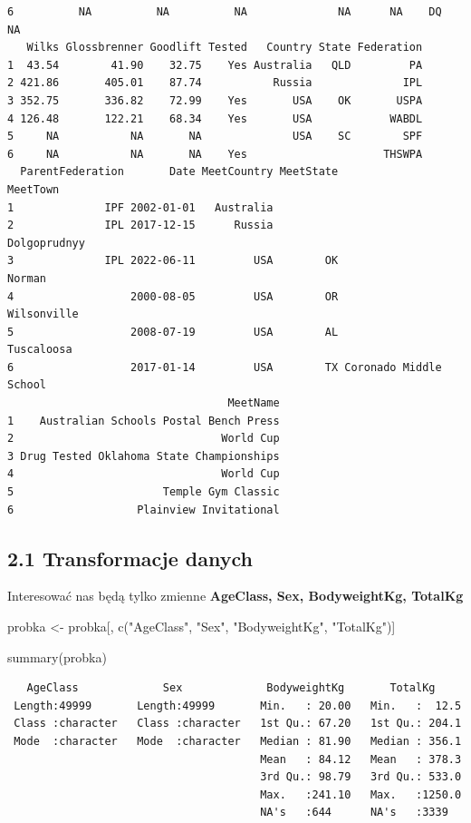 \documentclass[
  letterpaper,
  DIV=11,
  numbers=noendperiod]{scrartcl}
\newenvironment{Shaded}{\begin{snugshade}}{\end{snugshade}}
\newcommand{\FunctionTok}[1]{\textcolor[rgb]{0.28,0.35,0.67}{#1}}
\newcommand{\NormalTok}[1]{\textcolor[rgb]{0.00,0.23,0.31}{#1}}
\newcommand{\OtherTok}[1]{\textcolor[rgb]{0.00,0.23,0.31}{#1}}
\newcommand{\StringTok}[1]{\textcolor[rgb]{0.13,0.47,0.30}{#1}}
\begin{document}
\begin{verbatim}
6          NA          NA          NA              NA      NA    DQ     NA
   Wilks Glossbrenner Goodlift Tested   Country State Federation
1  43.54        41.90    32.75    Yes Australia   QLD         PA
2 421.86       405.01    87.74           Russia              IPL
3 352.75       336.82    72.99    Yes       USA    OK       USPA
4 126.48       122.21    68.34    Yes       USA            WABDL
5     NA           NA       NA              USA    SC        SPF
6     NA           NA       NA    Yes                     THSWPA
  ParentFederation       Date MeetCountry MeetState               MeetTown
1              IPF 2002-01-01   Australia                                 
2              IPL 2017-12-15      Russia                     Dolgoprudnyy
3              IPL 2022-06-11         USA        OK                 Norman
4                  2000-08-05         USA        OR            Wilsonville
5                  2008-07-19         USA        AL             Tuscaloosa
6                  2017-01-14         USA        TX Coronado Middle School
                                  MeetName
1    Australian Schools Postal Bench Press
2                                World Cup
3 Drug Tested Oklahoma State Championships
4                                World Cup
5                       Temple Gym Classic
6                   Plainview Invitational
\end{verbatim}

\hypertarget{transformacje-danych}{%
\subsection{2.1 Transformacje danych}\label{transformacje-danych}}

Interesować nas będą tylko zmienne \textbf{AgeClass, Sex, BodyweightKg,
TotalKg}

\begin{Shaded}
\begin{Highlighting}[]
\NormalTok{probka }\OtherTok{\textless{}{-}}\NormalTok{ probka[, }\FunctionTok{c}\NormalTok{(}\StringTok{"AgeClass"}\NormalTok{, }\StringTok{"Sex"}\NormalTok{, }\StringTok{"BodyweightKg"}\NormalTok{, }\StringTok{"TotalKg"}\NormalTok{)]}

\FunctionTok{summary}\NormalTok{(probka)}
\end{Highlighting}
\end{Shaded}

\begin{verbatim}
   AgeClass             Sex             BodyweightKg       TotalKg      
 Length:49999       Length:49999       Min.   : 20.00   Min.   :  12.5  
 Class :character   Class :character   1st Qu.: 67.20   1st Qu.: 204.1  
 Mode  :character   Mode  :character   Median : 81.90   Median : 356.1  
                                       Mean   : 84.12   Mean   : 378.3  
                                       3rd Qu.: 98.79   3rd Qu.: 533.0  
                                       Max.   :241.10   Max.   :1250.0  
                                       NA's   :644      NA's   :3339    
\end{verbatim}
\end{document}
